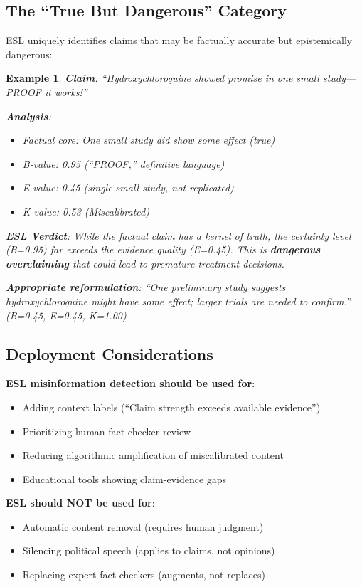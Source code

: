 \documentclass[11pt,a4paper]{article}
\newtheorem{example}{Example}[section]
\begin{document}
\subsection{The ``True But Dangerous'' Category}

ESL uniquely identifies claims that may be factually accurate but epistemically dangerous:

\begin{example}
\textbf{Claim}: ``Hydroxychloroquine showed promise in one small study---PROOF it works!''

\textbf{Analysis}:
\begin{itemize}
    \item Factual core: One small study did show some effect (true)
    \item B-value: 0.95 (``PROOF,'' definitive language)
    \item E-value: 0.45 (single small study, not replicated)
    \item K-value: 0.53 (Miscalibrated)
\end{itemize}

\textbf{ESL Verdict}: While the factual claim has a kernel of truth, the \textit{certainty level} (B=0.95) far exceeds the evidence quality (E=0.45). This is \textbf{dangerous overclaiming} that could lead to premature treatment decisions.

\textbf{Appropriate reformulation}: ``One preliminary study suggests hydroxychloroquine might have some effect; larger trials are needed to confirm.'' (B=0.45, E=0.45, K=1.00)
\end{example}

\subsection{Deployment Considerations}

\begin{warningbox}[title={Ethical Considerations}]
\textbf{ESL misinformation detection should be used for}:
\begin{itemize}
    \item Adding context labels (``Claim strength exceeds available evidence'')
    \item Prioritizing human fact-checker review
    \item Reducing algorithmic amplification of miscalibrated content
    \item Educational tools showing claim-evidence gaps
\end{itemize}

\textbf{ESL should NOT be used for}:
\begin{itemize}
    \item Automatic content removal (requires human judgment)
    \item Silencing political speech (applies to claims, not opinions)
    \item Replacing expert fact-checkers (augments, not replaces)
\end{itemize}
\end{warningbox}
\end{document}
